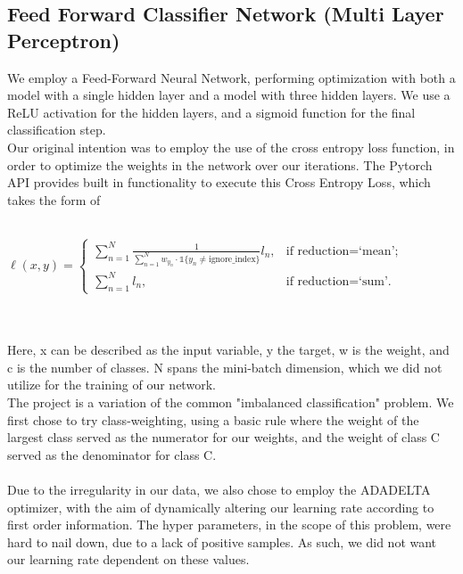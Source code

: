 \documentclass[11.5pt]{article}
\begin{document}
\subsection{Feed Forward Classifier Network (Multi Layer Perceptron)}
We employ a Feed-Forward Neural Network, performing optimization with both a model with a single hidden layer and a model with three hidden layers. We use a ReLU activation for the hidden layers, and a sigmoid function for the final classification step. 
\\ 
Our original intention was to employ the use of the cross entropy loss function, in order to optimize the weights in the network over our iterations. The Pytorch API provides built in functionality to execute this Cross Entropy Loss, which takes the form of
\\
\\
\begin{center}
$\ell(x, y) = \begin{cases}
              \sum_{n=1}^N \frac{1}{\sum_{n=1}^N w_{y_n} \cdot \mathbb{1}\{y_n \not= \text{ignore\_index}\}} l_n, &
               \text{if reduction} = \text{`mean';}\\
                \sum_{n=1}^N l_n,  &
                \text{if reduction} = \text{`sum'.}
            \end{cases}$
\end{center}
\\
\\
Here, x can be described as the input variable, y the target, w is the weight, and c is the number of classes. N spans the mini-batch dimension, which we did not utilize for the training of our network.
\\
The project is a variation of the common "imbalanced classification" problem. We first chose to try class-weighting, using a basic rule where the weight of the largest class served as the numerator for our weights, and the weight of class C served as the denominator for class C. 
\\
\\
Due to the irregularity in our data, we also chose to employ the ADADELTA optimizer, with the aim of dynamically altering our learning rate according to first order information. The hyper parameters, in the scope of this problem, were hard to nail down, due to a lack of positive samples. As such, we did not want our learning rate dependent on these values. 
\\
\\
\\
\end{document}

